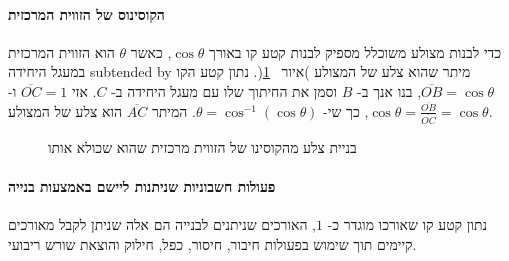 \documentclass[11pt,a4paper]{article}
\newcommand*{\disfrac}[2]{\displaystyle\frac{#1}{#2}}
\begin{document}
\paragraph{הקוסינוס של הזווית המרכזית}
כדי לבנות מצולע משוכלל מספיק לבנות קטע קו באורך 
$\cos \theta$,
כאשר
$\theta$ 
הוא הזווית המרכזית במעגל היחידה 
subtended by
מיתר שהוא צלע של המצולע
)איור
~\ref{fig.cosine}(.
נתון קטע הקו
$\overline{OB}=\cos\theta$,
בנו אנך ב-%
$B$
וסמן את החיתוך שלו עם מעגל היחידה ב-%
$C$.
אזי
$\overline{OC}=1$
ו-%
$\cos \theta=\disfrac{\overline{OB}}{\overline{OC}}=\cos \theta$,
כך שי-%
$\theta = \cos^{-1} (\cos \theta)$.
המיתר 
$\overline{AC}$
הוא צלע של המצולע.
\begin{figure}
\begin{center}
\caption{%
בניית צלע מהקוסינו של הזווית מרכזית שהוא שכולא אותו}
\label{fig.cosine}
\end{center}
\end{figure}

\paragraph{פעולות חשבוניות שניתנות ליישם באמצעות בנייה}

נתון קטע קו שאורכו מוגדר כ-%
$1$,
האורכים שניתנים לבנייה הם אלה שניתן לקבל מאורכים קיימים תוך שימוש בפעולות חיבור, חיסור, כפל, חילוק והוצאת שורש ריבועי.
\end{document}
